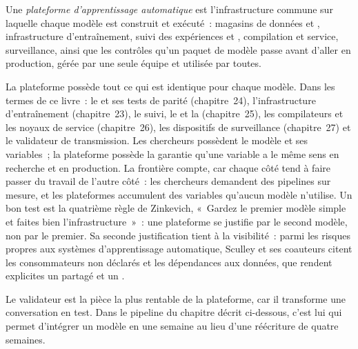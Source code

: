 \begin{definition}\label{def:ml:the-machine-learning-team:platform}
Une \emph{plateforme d'apprentissage automatique} est l'infrastructure commune sur laquelle chaque modèle est construit
et exécuté~: magasins de données et , infrastructure d'entraînement, suivi des expériences et , compilation et service,
surveillance, ainsi que les contrôles qu'un paquet de modèle passe avant d'aller en production, gérée par une seule équipe et utilisée par toutes.
\end{definition}

La plateforme possède tout ce qui est identique pour chaque modèle. Dans les termes de ce livre~: le  et ses tests de parité (chapitre~24),
l'infrastructure d'entraînement (chapitre~23), le suivi, le  et la  (chapitre~25), les compilateurs et les noyaux de service (chapitre~26),
les dispositifs de surveillance (chapitre~27) et le validateur de transmission.
Les chercheurs possèdent le modèle et ses variables~; la plateforme possède la garantie qu'une variable a le même sens en recherche et en production. La frontière compte, car chaque côté tend à faire passer du travail de l'autre côté~:
les chercheurs demandent des pipelines sur mesure, et les plateformes accumulent des variables qu'aucun modèle n'utilise. Un bon test est la quatrième règle de Zinkevich, «~Gardez le premier modèle simple et faites bien l'infrastructure~»~:
une plateforme se justifie par le second modèle, non par le premier. Sa seconde justification tient à la visibilité~:
parmi les risques propres aux systèmes d'apprentissage automatique, Sculley et ses coauteurs citent les consommateurs non déclarés
et les dépendances aux données, que rendent explicites un  partagé et un .

Le validateur est la pièce la plus rentable de la plateforme, car il transforme une conversation en test. Dans le pipeline du chapitre décrit ci-dessous,
c'est lui qui permet d'intégrer un modèle en une semaine au lieu d'une réécriture de quatre semaines.

